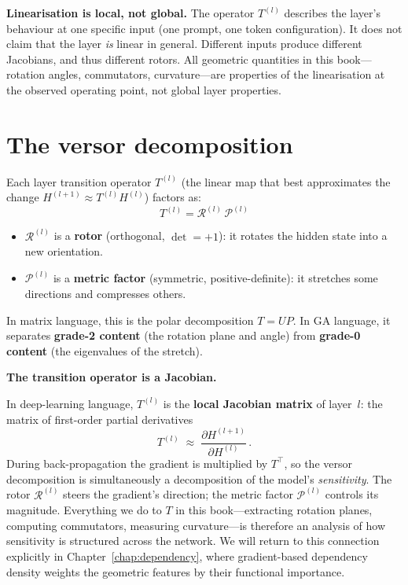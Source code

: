\documentclass[11pt, twoside, openright]{memoir}
\newcommand{\rotor}[1]{\mathcal{R}^{(#1)}}  %
\newcommand{\metric}[1]{\mathcal{P}^{(#1)}} %
\numberwithin{equation}{chapter}
\begin{document}
\begin{pitfall}
\textbf{Linearisation is local, not global.}
The operator $T^{(l)}$ describes the layer's behaviour at one
specific input (one prompt, one token configuration).  It does not
claim that the layer \emph{is} linear in general.  Different inputs
produce different Jacobians, and thus different rotors.  All
geometric quantities in this book---rotation angles, commutators,
curvature---are properties of the linearisation at the observed
operating point, not global layer properties.
\end{pitfall}

\section{The versor decomposition}

Each layer transition operator $T^{(l)}$ (the linear map that best
approximates the change $H^{(l+1)} \approx T^{(l)} H^{(l)}$) factors
as:
\begin{equation}
  T^{(l)} = \rotor{l} \, \metric{l}
\end{equation}

\begin{itemize}[nosep]
\item $\rotor{l}$ is a \textbf{rotor} (orthogonal, $\det = +1$):
  it rotates the hidden state into a new orientation.
\item $\metric{l}$ is a \textbf{metric factor} (symmetric,
  positive-definite): it stretches some directions and compresses others.
\end{itemize}

In matrix language, this is the polar decomposition $T = UP$.  In GA
language, it separates \textbf{grade-2 content} (the rotation plane and
angle) from \textbf{grade-0 content} (the eigenvalues of the stretch).

\begin{keyidea}
\textbf{The transition operator is a Jacobian.}

In deep-learning language, $T^{(l)}$ is the \textbf{local Jacobian
matrix} of layer~$l$: the matrix of first-order partial derivatives
\begin{equation}\label{eq:jacobian}
  T^{(l)} \;\approx\; \frac{\partial H^{(l+1)}}{\partial H^{(l)}}\,.
\end{equation}
During back-propagation the gradient is multiplied by $T^{\top}$, so
the versor decomposition is simultaneously a decomposition of the
model's \emph{sensitivity}.  The rotor $\rotor{l}$ steers the
gradient's direction; the metric factor $\metric{l}$ controls its
magnitude.  Everything we do to $T$ in this book---extracting
rotation planes, computing commutators, measuring curvature---is
therefore an analysis of how sensitivity is structured across the
network.  We will return to this connection explicitly in
Chapter~\ref{chap:dependency}, where gradient-based dependency
density weights the geometric features by their functional
importance.
\end{keyidea}
\end{document}
